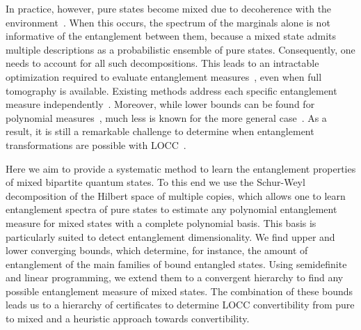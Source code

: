 \documentclass[aps,pra,twocolumn,showpacs,superscriptaddress,groupedaddress]{revtex4-2}
\begin{document}
In practice, however, pure states become mixed due to decoherence with the environment~\cite{Zurek2003,BreuerPetruccione2002,NielsenChuang2010}. When this occurs, the spectrum of the marginals alone is not informative of the entanglement between them, because a mixed state admits multiple descriptions as a probabilistic ensemble of pure states. Consequently, 
one needs to account for all such decompositions. This leads to an intractable optimization required to evaluate entanglement measures~\cite{Bennett1996EoF, Uhlmann1998, Uhlmann2010Roofs, Horodecki2009RMP}, even when full tomography is available.
Existing methods address each specific entanglement measure independently~\cite{Wootters1998, TerhalVollbrecht2000, VollbrechtWerner2001, Mintert2004Concurrence, Chen2005Concurrence, Chen2005EoF, Guhne2007Estimating, Eisert2007QuantWitness}. Moreover, while lower bounds can be found for polynomial measures~\cite{Toth2015CroofTP}, much less is known for the more general case~\cite{PlenioVirmani2007}. As a result, it is still a remarkable challenge to determine when entanglement transformations are possible with LOCC~\cite{Gour2005InfiniteConditions, Chitambar2014LOCC, PhysRevX.8.031020}. 

Here we aim to provide a systematic method to learn the entanglement properties of mixed bipartite quantum states. 
To this end we use the Schur-Weyl decomposition of the Hilbert space of multiple copies, which allows one
to learn entanglement spectra of pure states \cite{Alicki1988, Keyl2001EstimatingSpectrum} to estimate any polynomial entanglement measure for mixed states with a complete polynomial basis. This basis is particularly suited to detect entanglement dimensionality. We find upper and lower converging bounds, which determine, for instance, the amount of entanglement of the main families of bound entangled states. Using semidefinite and linear programming, we extend them to a convergent hierarchy to find any possible entanglement measure of mixed states. 
The combination of these bounds leads us to a hierarchy of certificates to determine LOCC convertibility from pure to mixed and a heuristic approach towards convertibility.

\iffalse
\end{document}
